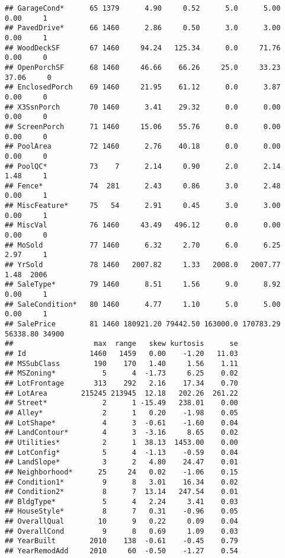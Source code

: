 \documentclass[
]{article}
\begin{document}
\begin{verbatim}
## GarageCond*      65 1379      4.90     0.52      5.0      5.00     0.00     1
## PavedDrive*      66 1460      2.86     0.50      3.0      3.00     0.00     1
## WoodDeckSF       67 1460     94.24   125.34      0.0     71.76     0.00     0
## OpenPorchSF      68 1460     46.66    66.26     25.0     33.23    37.06     0
## EnclosedPorch    69 1460     21.95    61.12      0.0      3.87     0.00     0
## X3SsnPorch       70 1460      3.41    29.32      0.0      0.00     0.00     0
## ScreenPorch      71 1460     15.06    55.76      0.0      0.00     0.00     0
## PoolArea         72 1460      2.76    40.18      0.0      0.00     0.00     0
## PoolQC*          73    7      2.14     0.90      2.0      2.14     1.48     1
## Fence*           74  281      2.43     0.86      3.0      2.48     0.00     1
## MiscFeature*     75   54      2.91     0.45      3.0      3.00     0.00     1
## MiscVal          76 1460     43.49   496.12      0.0      0.00     0.00     0
## MoSold           77 1460      6.32     2.70      6.0      6.25     2.97     1
## YrSold           78 1460   2007.82     1.33   2008.0   2007.77     1.48  2006
## SaleType*        79 1460      8.51     1.56      9.0      8.92     0.00     1
## SaleCondition*   80 1460      4.77     1.10      5.0      5.00     0.00     1
## SalePrice        81 1460 180921.20 79442.50 163000.0 170783.29 56338.80 34900
##                   max  range   skew kurtosis      se
## Id               1460   1459   0.00    -1.20   11.03
## MSSubClass        190    170   1.40     1.56    1.11
## MSZoning*           5      4  -1.73     6.25    0.02
## LotFrontage       313    292   2.16    17.34    0.70
## LotArea        215245 213945  12.18   202.26  261.22
## Street*             2      1 -15.49   238.01    0.00
## Alley*              2      1   0.20    -1.98    0.05
## LotShape*           4      3  -0.61    -1.60    0.04
## LandContour*        4      3  -3.16     8.65    0.02
## Utilities*          2      1  38.13  1453.00    0.00
## LotConfig*          5      4  -1.13    -0.59    0.04
## LandSlope*          3      2   4.80    24.47    0.01
## Neighborhood*      25     24   0.02    -1.06    0.15
## Condition1*         9      8   3.01    16.34    0.02
## Condition2*         8      7  13.14   247.54    0.01
## BldgType*           5      4   2.24     3.41    0.03
## HouseStyle*         8      7   0.31    -0.96    0.05
## OverallQual        10      9   0.22     0.09    0.04
## OverallCond         9      8   0.69     1.09    0.03
## YearBuilt        2010    138  -0.61    -0.45    0.79
## YearRemodAdd     2010     60  -0.50    -1.27    0.54

\end{verbatim}
\end{document}
